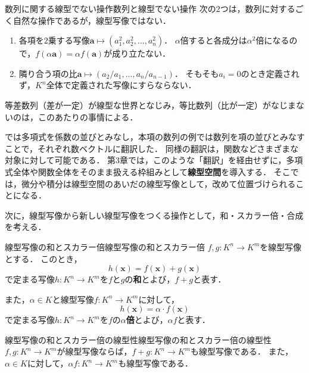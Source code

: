 \begin{example}{数列に関する線型でない操作}{数列と線型でない操作}
  次の$2$つは，数列に対するごく自然な操作であるが，線型写像ではない．
  \begin{enumerate}[label=(\arabic*),leftmargin=3.2em]
    \item 各項を$2$乗する写像$\bm{a} \mapsto (a_1^2, a_2^2, \dots, a_n^2)$．
      $\alpha$倍すると各成分は$\alpha^2$倍になるので，$f(\alpha\bm{a}) = \alpha f(\bm{a})$が成り立たない．
    \item 隣り合う項の比$\bm{a} \mapsto (a_2/a_1, \dots, a_n/a_{n-1})$．
      そもそも$a_i = 0$のとき定義されず，$K^n$全体で定義された写像にすらならない．
  \end{enumerate}
  等差数列（差が一定）が線型な世界となじみ，等比数列（比が一定）がなじまないのは，このあたりの事情による．
\end{example}

\begin{mycolumn}
  では多項式を係数の並びとみなし，本項の数列の例では数列を項の並びとみなすことで，それぞれ数ベクトルに翻訳した．
  同様の翻訳は，関数などさまざまな対象に対して可能である．
  第3章では，このような「翻訳」を経由せずに，多項式全体や関数全体をそのまま扱える枠組みとして\textbf{線型空間}を導入する．
  そこでは，微分や積分は線型空間のあいだの線型写像として，改めて位置づけられることになる．
\end{mycolumn}

次に，線型写像から新しい線型写像をつくる操作として，和・スカラー倍・合成を考える．

\begin{definition}{線型写像の和とスカラー倍}{線型写像の和とスカラー倍}
  $f, g \colon K^n \to K^m$を線型写像とする．
  このとき，
  \[
    h(\bm{x}) = f(\bm{x}) + g(\bm{x})
  \]
  で定まる写像$h \colon K^n \to K^m$を$f$と$g$の\textbf{和}とよび，$f + g$と表す．

  また，$\alpha \in K$と線型写像$f \colon K^n \to K^m$に対して，
  \[
    h(\bm{x}) = \alpha \cdot f(\bm{x})
  \]
  で定まる写像$h \colon K^n \to K^m$を$f$の\textbf{$\alpha$倍}とよび，$\alpha f$と表す．
\end{definition}

\begin{prop}{線型写像の和とスカラー倍の線型性}{線型写像の和とスカラー倍の線型性}
  $f, g \colon K^n \to K^m$が線型写像ならば，$f + g \colon K^n \to K^m$も線型写像である．
  また，$\alpha \in K$に対して，$\alpha f \colon K^n \to K^m$も線型写像である．
\end{prop}

